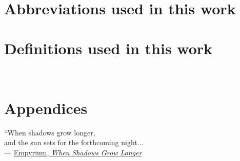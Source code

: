 \documentclass[12pt, twoside, openright]{report}
\begin{document}
\cleardoublepage

\newpage
\thispagestyle{plain}
~\newpage


\smaller{


}


\chapter*{\vspace*{-4cm}Abbreviations used in this work}
\label{chapter: abbreviations}



\chapter*{\vspace*{-4cm}Definitions used in this work}
\label{chapter: definitions}


\newpage
\thispagestyle{plain}
~\newpage


\chapter*{Appendices}
\vspace*{2cm}
\vbox{\large``When shadows grow longer,\\
and the sun sets for the forthcoming night...\\

--- \href{https://empyrium.bandcamp.com/album/where-at-night-the-wood-grouse-plays}{Empyrium, \textit{When Shadows Grow Longer}}}

\newpage

\appendix

\normalsize
\end{document}
